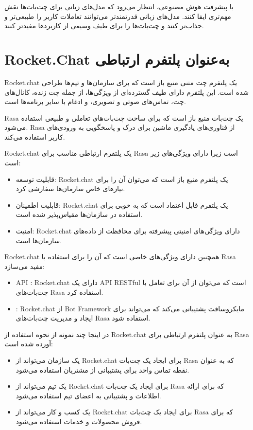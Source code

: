 {با پیشرفت هوش مصنوعی، انتظار می‌رود که مدل‌های زبانی برای چت‌بات‌ها نقش مهم‌تری ایفا کنند. مدل‌های زبانی قدرتمندتر می‌توانند تعاملات کاربر را طبیعی‌تر و جذاب‌تر کنند و چت‌بات‌ها را برای طیف وسیعی از کاربردها مفیدتر کنند.


\section{Rocket.Chat به‌عنوان پلتفرم ارتباطی}

Rocket.chat یک پلتفرم چت متنی منبع باز است که برای سازمان‌ها و تیم‌ها طراحی شده است. این پلتفرم دارای طیف گسترده‌ای از ویژگی‌ها، از جمله چت زنده، کانال‌های چت، تماس‌های صوتی و تصویری، و ادغام با سایر برنامه‌ها است.

Rasa یک چت‌بات منبع باز است که برای ساخت چت‌بات‌های تعاملی و طبیعی استفاده می‌شود. Rasa از فناوری‌های یادگیری ماشین برای درک و پاسخگویی به ورودی‌های کاربر استفاده می‌کند.

Rocket.chat یک پلتفرم ارتباطی مناسب برای Rasa است زیرا دارای ویژگی‌های زیر است:

\begin{itemize}
    \item قابلیت توسعه: Rocket.chat یک پلتفرم منبع باز است که می‌توان آن را برای نیازهای خاص سازمان‌ها سفارشی کرد.
    \item قابلیت اطمینان: Rocket.chat یک پلتفرم قابل اعتماد است که به خوبی برای استفاده در سازمان‌ها مقیاس‌پذیر شده است.
    \item امنیت: Rocket.chat دارای ویژگی‌های امنیتی پیشرفته برای محافظت از داده‌های سازمان‌ها است.
\end{itemize}

Rocket.chat همچنین دارای ویژگی‌های خاصی است که آن را برای استفاده با Rasa مفید می‌سازد:

\begin{itemize}
    \item API : Rocket.chat دارای یک API RESTful است که می‌توان از آن برای تعامل با چت‌بات‌های Rasa استفاده کرد.
    \item {}: Rocket.chat از Bot Framework مایکروسافت پشتیبانی می‌کند که می‌تواند برای ایجاد و مدیریت چت‌بات‌های Rasa استفاده شود.
\end{itemize}

در اینجا چند نمونه از نحوه استفاده از Rocket.chat به عنوان پلتفرم ارتباطی برای Rasa آورده شده است:

\begin{itemize}
    \item یک سازمان می‌تواند از Rocket.chat برای ایجاد یک چت‌بات Rasa که به عنوان نقطه تماس واحد برای پشتیبانی از مشتریان استفاده می‌شود.
    \item یک تیم می‌تواند از Rocket.chat برای ایجاد یک چت‌بات Rasa که برای ارائه اطلاعات و پشتیبانی به اعضای تیم استفاده می‌شود.
    \item یک کسب و کار می‌تواند از Rocket.chat برای ایجاد یک چت‌بات Rasa که برای فروش محصولات و خدمات استفاده می‌شود.
\end{itemize}

}
